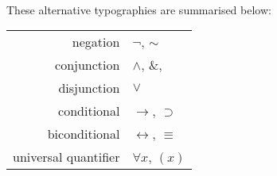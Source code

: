 \
\\These alternative typographies are summarised below:

\begin{center}
\begin{tabular}{rl}
negation & $\neg$, ${\sim}$\\
conjunction & $\wedge$, \&, {\scriptsize\textbullet}\\
disjunction & $\vee$\\
conditional & $\rightarrow$, $\supset$\\
biconditional & $\leftrightarrow$, $\equiv$\\
universal quantifier & $\forall x$, $(x)$
\end{tabular}
\end{center}


%
%
%
%
%
%
%
